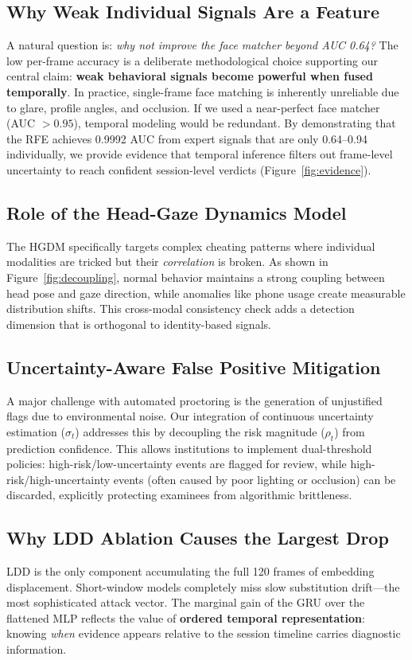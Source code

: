 \documentclass[conference]{IEEEtran}
\begin{document}
\subsection{Why Weak Individual Signals Are a Feature}
A natural question is: \textit{why not improve the face matcher beyond AUC 0.64?} The low per-frame accuracy is a deliberate methodological choice supporting our central claim: \textbf{weak behavioral signals become powerful when fused temporally}. In practice, single-frame face matching is inherently unreliable due to glare, profile angles, and occlusion. If we used a near-perfect face matcher (AUC $> 0.95$), temporal modeling would be redundant. By demonstrating that the RFE achieves 0.9992 AUC from expert signals that are only 0.64--0.94 individually, we provide evidence that temporal inference filters out frame-level uncertainty to reach confident session-level verdicts (Figure~\ref{fig:evidence}).

\subsection{Role of the Head-Gaze Dynamics Model}
The HGDM specifically targets complex cheating patterns where individual modalities are tricked but their \emph{correlation} is broken. As shown in Figure~\ref{fig:decoupling}, normal behavior maintains a strong coupling between head pose and gaze direction, while anomalies like phone usage create measurable distribution shifts. This cross-modal consistency check adds a detection dimension that is orthogonal to identity-based signals.

\subsection{Uncertainty-Aware False Positive Mitigation}
A major challenge with automated proctoring is the generation of unjustified flags due to environmental noise. Our integration of continuous uncertainty estimation ($\sigma_t$) addresses this by decoupling the risk magnitude ($\rho_t$) from prediction confidence. This allows institutions to implement dual-threshold policies: high-risk/low-uncertainty events are flagged for review, while high-risk/high-uncertainty events (often caused by poor lighting or occlusion) can be discarded, explicitly protecting examinees from algorithmic brittleness.

\subsection{Why LDD Ablation Causes the Largest Drop}
LDD is the only component accumulating the full 120 frames of embedding displacement. Short-window models completely miss slow substitution drift---the most sophisticated attack vector. The marginal gain of the GRU over the flattened MLP reflects the value of \textbf{ordered temporal representation}: knowing \emph{when} evidence appears relative to the session timeline carries diagnostic information.
\end{document}
